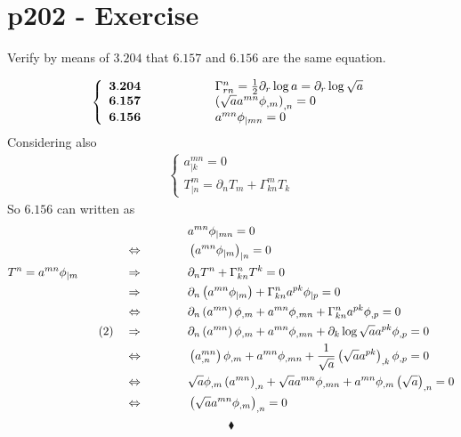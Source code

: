 \section{p202 - Exercise}
\begin{tcolorbox}
Verify by means of  $\mathbf{3.204}$ that $\mathbf{6.157}$ and $\mathbf{6.156}$  are the same equation.
\end{tcolorbox}
\begin{align}
\left\{\begin{array}{lll}
\mathbf{3.204}&\quad\quad\quad\quad&\Gamma^{n}_{rn} = \frac{1}{2}\partial_r\log a = \partial_r\log \sqrt{a}\\
\mathbf{6.157}&\quad\quad\quad\quad&\left(\sqrt{a}a^{mn}\phi_{,m}\right)_{,n}=0\\
\mathbf{6.156}&\quad\quad\quad\quad&a^{mn}\phi_{|mn}=0
\end{array}\right.
\end{align}
Considering also
\begin{align}
\left\{\begin{array}{l}
a^{mn}_{|k}=0\\
T^m_{|n}= \partial_n T_m+\Gamma^{m}_{kn}T_k
\end{array}\right.
\end{align}
So $\mathbf{6.156}$ can written as
\begin{align}
& a^{mn}\phi_{|mn}=0\\
\Leftrightarrow\quad\quad\quad\quad & \left(a^{mn}\phi_{|m}\right)_{|n}=0\\
T^n = a^{mn}\phi_{|m}\quad\quad\quad\quad\Rightarrow\quad\quad\quad\quad &\partial_n T^n+\Gamma^{n}_{kn}T^k=0\\
\Rightarrow\quad\quad\quad\quad &\partial_n \left(a^{mn}\phi_{|m}\right)+\Gamma^{n}_{kn}a^{pk}\phi_{|p}=0\\
\Leftrightarrow\quad\quad\quad\quad &\partial_n \left(a^{mn}\right) \phi_{,m}+a^{mn}\phi_{,mn}+\Gamma^{n}_{kn}a^{pk}\phi_{,p}=0\\
\text{(2)}\quad \Rightarrow\quad\quad\quad\quad &\partial_n \left(a^{mn}\right) \phi_{,m}+a^{mn}\phi_{,mn}+\partial_k\log \sqrt{a}a^{pk}\phi_{,p}=0\\
\Leftrightarrow\quad\quad\quad\quad &\left(a^{mn}_{,n}\right) \phi_{,m}+a^{mn}\phi_{,mn}+\frac{1}{\sqrt{a}}\left(\sqrt{a}a^{pk}\right)_{,k}\phi_{,p}=0\\
\Leftrightarrow\quad\quad\quad\quad &\sqrt{a} \phi_{,m}\left(a^{mn}\right)_{,n}+\sqrt{a}a^{mn}\phi_{,mn}+a^{mn}\phi_{,m}\left(\sqrt{a}\right)_{,n}=0\\
\Leftrightarrow\quad\quad\quad\quad &\left(\sqrt{a}a^{mn}\phi_{,m}\right)_{,n}=0
\end{align}
 $$\blacklozenge$$
\newpage


